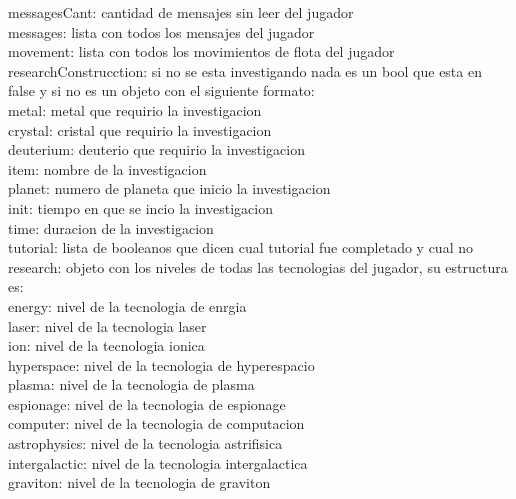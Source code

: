 \documentclass{article}
\newcommand\tab[1][1cm]{\hspace*{#1}}
\begin{document}
            \tab messagesCant: cantidad de mensajes sin leer del jugador\\
            \tab messages: lista con todos los mensajes del jugador\\
            \tab movement: lista con todos los movimientos de flota del jugador\\
            \tab researchConstrucction: si no se esta investigando nada es un bool que esta en false y si no es un objeto con el siguiente formato:\\
            \tab\tab metal: metal que requirio la investigacion\\
            \tab\tab crystal: cristal que requirio la investigacion\\
            \tab\tab deuterium: deuterio que requirio la investigacion\\
            \tab\tab item: nombre de la investigacion\\
            \tab\tab planet: numero de planeta que inicio la investigacion\\
            \tab\tab init: tiempo en que se incio la investigacion\\
            \tab\tab time: duracion de la investigacion\\
            \tab tutorial: lista de booleanos que dicen cual tutorial fue completado y cual no\\
            \tab research: objeto con los niveles de todas las tecnologias del jugador, su estructura es:\\
            \tab\tab energy: nivel de la tecnologia de enrgia\\
            \tab\tab laser: nivel de la tecnologia laser\\
            \tab\tab ion: nivel de la tecnologia ionica\\
            \tab\tab hyperspace: nivel de la tecnologia de hyperespacio\\
            \tab\tab plasma: nivel de la tecnologia de plasma\\
            \tab\tab espionage: nivel de la tecnologia de espionage\\
            \tab\tab computer: nivel de la tecnologia de computacion\\
            \tab\tab astrophysics: nivel de la tecnologia astrifisica\\
            \tab\tab intergalactic: nivel de la tecnologia intergalactica\\
            \tab\tab graviton: nivel de la tecnologia de graviton\\
\end{document}
